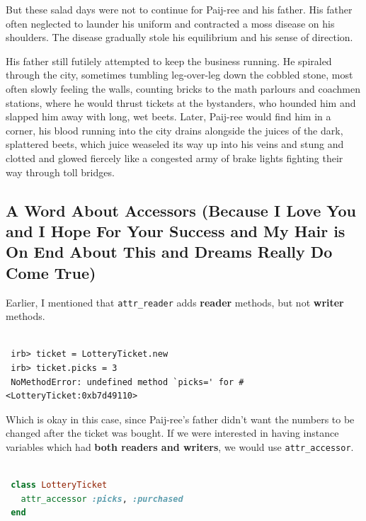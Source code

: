\documentclass[10pt,twoside]{report}
\begin{document}
But these salad days were not to continue for Paij-ree and his father.
His father often neglected to launder his uniform and contracted a
moss disease on his shoulders.  The disease gradually stole his
equilibrium and his sense of direction.

His father still futilely attempted to keep the business running.  He
spiraled through the city, sometimes tumbling leg-over-leg down the
cobbled stone, most often slowly feeling the walls, counting bricks to
the math parlours and coachmen stations, where he would thrust tickets
at the bystanders, who hounded him and slapped him away with long, wet
beets.  Later, Paij-ree would find him in a corner, his blood running
into the city drains alongside the juices of the dark, splattered
beets, which juice weaseled its way up into his veins and stung and
clotted and glowed fiercely like a congested army of brake lights
fighting their way through toll bridges.



\subsection{A Word About Accessors (Because I Love You and I Hope For
  Your Success and My Hair is On End About This and Dreams Really Do
  Come True)}



Earlier, I mentioned that \lstinline[breaklines=true]|attr_reader|
adds {\bf reader} methods, but not {\bf writer} methods.


\begin{lstlisting}

 irb> ticket = LotteryTicket.new
 irb> ticket.picks = 3
 NoMethodError: undefined method `picks=' for #<LotteryTicket:0xb7d49110>

\end{lstlisting}


Which is okay in this case, since Paij-ree's father didn't want the
numbers to be changed after the ticket was bought.  If we were
interested in having instance variables which had {\bf both readers
  and writers}, we would use
\lstinline[breaklines=true]|attr_accessor|.


\begin{lstlisting}[basicstyle=\ttfamily\color{basiccolor},
    commentstyle = \ttfamily\color{commentcolor},
    keywordstyle=\ttfamily\color{keywordscolor},
    stringstyle=\color{stringcolor},
    language=Ruby,
    basicstyle=\small\ttfamily,
    showstringspaces=false,
  ]

 class LotteryTicket
   attr_accessor :picks, :purchased
 end

\end{lstlisting}
\end{document}
